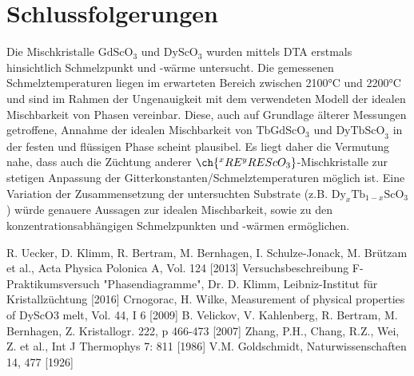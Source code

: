 \documentclass[aps,twocolumn,secnumarabic,nobalancelastpage,amsmath,amssymb,
nofootinbib,superscriptaddress]{revtex4-1}
\begin{document}

\section{Schlussfolgerungen}

\noindent Die Mischkristalle $\text{Gd}\text{ScO}_3$ und $\text{Dy}\text{ScO}_3$ wurden mittels DTA erstmals hinsichtlich Schmelzpunkt und -wärme untersucht. Die gemessenen Schmelztemperaturen liegen im erwarteten Bereich zwischen 2100°C und 2200°C und
sind im Rahmen der Ungenauigkeit mit dem verwendeten Modell der idealen Mischbarkeit von Phasen vereinbar. Diese, auch auf Grundlage älterer Messungen getroffene, Annahme der idealen Mischbarkeit von $\text{TbGdScO}_3$ und $\text{DyTbScO}_3$ in der
festen und flüssigen Phase scheint plausibel. Es liegt daher die Vermutung nahe, dass auch die Züchtung anderer $\ch{^{x}RE^{y}REScO_3}$-Mischkristalle zur stetigen Anpassung der Gitterkonstanten/Schmelztemperaturen möglich ist.
Eine Variation der Zusammensetzung der untersuchten Substrate (z.B. $\text{Dy}_{x}\text{Tb}_{1-x}\text{ScO}_3$) würde genauere Aussagen zur idealen Mischbarkeit, sowie zu den konzentrationsabhängigen Schmelzpunkten und -wärmen ermöglichen.




\begin{thebibliography}{99}
R. Uecker, D. Klimm, R. Bertram, M. Bernhagen, I. Schulze-Jonack, M. Brützam et al., Acta Physica Polonica A, Vol. 124 [2013]
Versuchsbeschreibung F-Praktikumsversuch "Phasendiagramme", Dr. D. Klimm, Leibniz-Institut für Kristallzüchtung [2016]
Crnogorac, H. Wilke, Measurement of physical properties of DyScO3 melt, Vol. 44, I 6 [2009]
B. Velickov, V. Kahlenberg, R. Bertram, M. Bernhagen, Z. Kristallogr. 222, p 466-473 [2007]
Zhang, P.H., Chang, R.Z., Wei, Z. et al., Int J Thermophys 7: 811 [1986]
V.M. Goldschmidt, Naturwissenschaften 14, 477 [1926]
\end{thebibliography}
\end{document}
